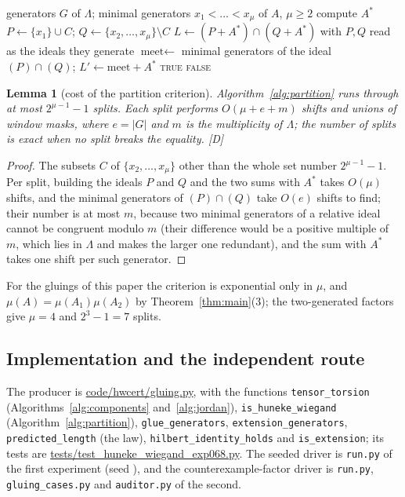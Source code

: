 \documentclass[11pt]{article}
\newtheorem{lemma}[theorem]{Lemma}
\theoremstyle{definition}
\theoremstyle{remark}
\newcommand{\mD}{\emph{[D]}}
\begin{document}
\begin{algorithm}[t]
\caption{Generator form of the Huneke--Wiegand criterion for a non-principal relative ideal $A=(x_1,\dots,x_\mu)$.}\label{alg:partition}
\begin{algorithmic}[1]
\Require generators $G$ of $\Lambda$; minimal generators $x_1<\dots<x_\mu$ of $A$, $\mu\ge2$
\State compute $A^*$
  \State $P\gets\{x_1\}\cup C$; $Q\gets\{x_2,\dots,x_\mu\}\setminus C$
  \State $L\gets(P+A^*)\cap(Q+A^*)$ with $P,Q$ read as the ideals they generate
  \State $\text{meet}\gets$ minimal generators of the ideal $(P)\cap(Q)$; $L'\gets\text{meet}+A^*$
   \Return \textsc{true} \EndIf
\EndFor
\State \Return \textsc{false}
\end{algorithmic}
\end{algorithm}

\begin{lemma}[cost of the partition criterion]\label{lem:cost}
Algorithm~\ref{alg:partition} runs through at most $2^{\mu-1}-1$ splits. Each split performs $O(\mu+e+m)$ shifts and unions of
window masks, where $e=|G|$ and $m$ is the multiplicity of $\Lambda$; the number of splits is exact when no split breaks the
equality. \mD{}
\end{lemma}

\begin{proof}
The subsets $C$ of $\{x_2,\dots,x_\mu\}$ other than the whole set number $2^{\mu-1}-1$. Per split, building the ideals $P$
and $Q$ and the two sums with $A^*$ takes $O(\mu)$ shifts, and the minimal generators of $(P)\cap(Q)$ take $O(e)$ shifts
to find; their number is at most $m$, because two minimal generators of a relative ideal cannot be congruent modulo $m$ (their
difference would be a positive multiple of $m$, which lies in $\Lambda$ and makes the larger one redundant), and the sum with
$A^*$ takes one shift per such generator.
\end{proof}

For the gluings of this paper the criterion is exponential only in $\mu$, and $\mu(A)=\mu(A_1)\mu(A_2)$ by
Theorem~\ref{thm:main}(3); the two-generated factors give $\mu=4$ and $2^{3}-1=7$ splits.

\subsection{Implementation and the independent route}

\begingroup\raggedright
The producer is \url{code/hwcert/gluing.py}, with the functions \texttt{tensor\_torsion} (Algorithms~\ref{alg:components}
and~\ref{alg:jordan}), \texttt{is\_huneke\_wiegand} (Algorithm~\ref{alg:partition}), \texttt{glue\_generators},
\texttt{extension\_generators}, \texttt{predicted\_length} (the law), \texttt{hilbert\_identity\_holds} and
\texttt{is\_extension}; its tests are \url{tests/test_huneke_wiegand_exp068.py}. The seeded driver is
\texttt{run.py} of the first experiment (seed \Seed), and the counterexample-factor driver is \texttt{run.py},
\texttt{gluing\_cases.py} and \texttt{auditor.py} of the second.
\par\endgroup
\end{document}
